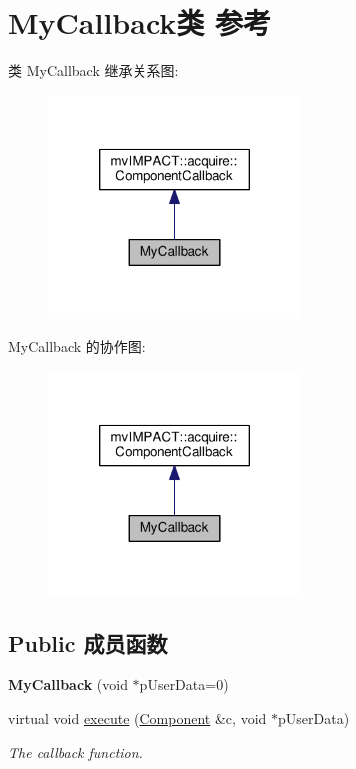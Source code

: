 \hypertarget{class_my_callback}{\section{My\+Callback类 参考}
\label{class_my_callback}
}


类 My\+Callback 继承关系图\+:
\nopagebreak
\begin{figure}[H]
\begin{center}
\leavevmode
\includegraphics[width=190pt]{class_my_callback__inherit__graph}
\end{center}
\end{figure}


My\+Callback 的协作图\+:
\nopagebreak
\begin{figure}[H]
\begin{center}
\leavevmode
\includegraphics[width=190pt]{class_my_callback__coll__graph}
\end{center}
\end{figure}
\subsection*{Public 成员函数}
\begin{DoxyCompactItemize}
\item 
\hypertarget{class_my_callback_acf894abf04d548c3bee5b3571f5881d2}{{\bfseries My\+Callback} (void $\ast$p\+User\+Data=0)}\label{class_my_callback_acf894abf04d548c3bee5b3571f5881d2}

\item 
virtual void \hyperlink{class_my_callback_abca435945a6153c057be2a98bf57a9d1}{execute} (\hyperlink{classmv_i_m_p_a_c_t_1_1acquire_1_1_component}{Component} \&c, void $\ast$p\+User\+Data)
\begin{DoxyCompactList}\small\item\em The callback function. \end{DoxyCompactList}\end{DoxyCompactItemize}


